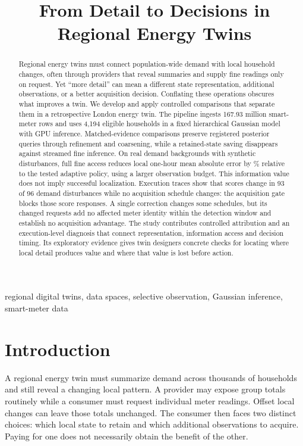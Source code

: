 \documentclass[conference]{IEEEtran}
\title{From Detail to Decisions in Regional Energy Twins}
\author{\IEEEauthorblockN{Alexander V. Mantzaris}
\IEEEauthorblockA{School of Data, Mathematical and Statistical Sciences\\
University of Central Florida\\
alexander.mantzaris@ucf.edu}}
\begin{document}
\maketitle

\begin{abstract}
Regional energy twins must connect population-wide demand with local household changes, often through providers that reveal summaries and supply fine readings only on request. Yet ``more detail'' can mean a different state representation, additional observations, or a better acquisition decision. Conflating these operations obscures what improves a twin. We develop and apply controlled comparisons that separate them in a retrospective London energy twin. The pipeline ingests 167.93 million smart-meter rows and uses 4,194 eligible households in a fixed hierarchical Gaussian model with GPU inference. Matched-evidence comparisons preserve registered posterior queries through refinement and coarsening, while a retained-state saving disappears against streamed fine inference. On real demand backgrounds with synthetic disturbances, full fine access reduces local one-hour mean absolute error by \FineGainPercent{}\% relative to the tested adaptive policy, using a larger observation budget. This information value does not imply successful localization. Execution traces show that scores change in 93 of 96 demand disturbances while no acquisition schedule changes: the acquisition gate blocks those score responses. A single correction changes some schedules, but its changed requests add no affected meter identity within the detection window and establish no acquisition advantage. The study contributes controlled attribution and an execution-level diagnosis that connect representation, information access and decision timing. Its exploratory evidence gives twin designers concrete checks for locating where local detail produces value and where that value is lost before action.
\end{abstract}
\begin{IEEEkeywords}
regional digital twins, data spaces, selective observation, Gaussian inference, smart-meter data
\end{IEEEkeywords}

\section{Introduction}
A regional energy twin must summarize demand across thousands of households and still reveal a changing local pattern. A provider may expose group totals routinely while a consumer must request individual meter readings. Offset local changes can leave those totals unchanged. The consumer then faces two distinct choices: which local state to retain and which additional observations to acquire. Paying for one does not necessarily obtain the benefit of the other.
\end{document}
